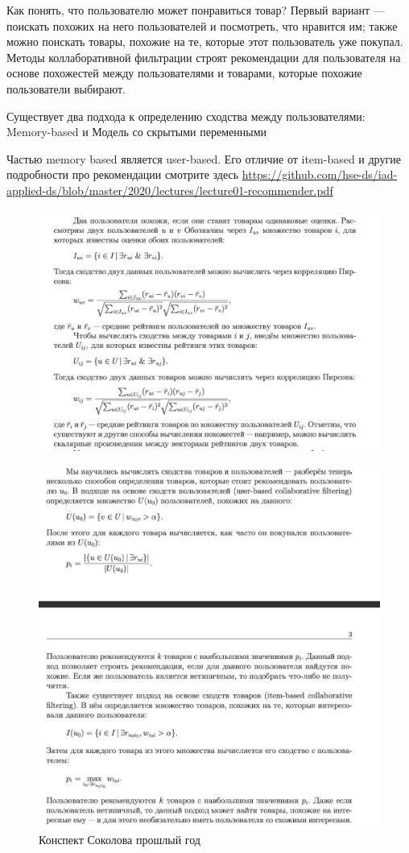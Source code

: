 
	
	Как понять, что пользователю может понравиться товар? Первый вариант — поискать похожих на него пользователей и посмотреть, что нравится им; также можно поискать товары, похожие на те, которые этот пользователь уже покупал. Методы коллаборативной фильтрации строят рекомендации для пользователя на основе похожестей между пользователями и товарами, которые похожие пользователи выбирают.
	

	Существует два подхода к определению сходства между пользователями: Memory-based и Модель со скрытыми переменными
	
    Частью memory based является user-based. Его отличие от item-based и другие подробности про рекомендации смотрите здесь \url{https://github.com/hse-ds/iad-applied-ds/blob/master/2020/lectures/lecture01-recommender.pdf}
	
		
		\begin{figure}[H]
\centering
\includegraphics[width=0.7\linewidth]{16_memory1.jpg}
\label{fig:16_memory1} 
\end{figure}
	
			\begin{figure}[H]
\centering
\includegraphics[width=0.7\linewidth]{16_memory2.jpg}
\caption{Конспект Соколова прошлый год}
\label{fig:16_memory2} 
\end{figure}
